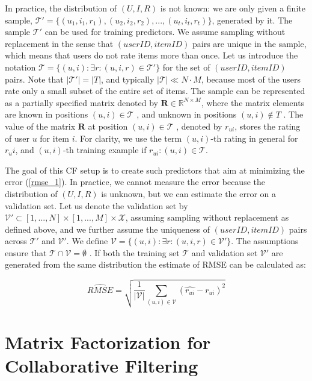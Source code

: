 \documentclass[10pt,a4paper]{article}  %
\begin{document}
In practice, the distribution of $(U,I,R)$ is not known: we are only given a finite sample, $\mathcal{T}' = \{(u_1,i_1,r_1),(u_2,i_2,r_2),...,(u_t,i_t,r_t)\}$, generated by it. The sample $\mathcal{T}'$ can be used for training predictors. We assume sampling without replacement in the sense that $(user ID, item ID)$ pairs are unique in the sample, which means that users do not rate items more than once. Let us introduce the notation $\mathcal{T} =\{(u,i):\exists{r}:(u,i,r) \in \mathcal{T}' \}$ for the set of $(userID, itemID)$ pairs. Note that $|\mathcal{T}'|=|T|$, and typically $|\mathcal{T}| \ll N \cdot M$, because most of the users rate only a small subset of the entire set of items. The sample can be represented as a partially specified matrix denoted by $\mathbf{R} \in \mathbb{R}^{N \times M}$, where the matrix elements are known in positions $(u,i) \in \mathcal{T}$ , and unknown in positions $(u,i) \notin T$ . The value of the matrix $\mathbf{R}$ at position $(u,i) \in \mathcal{T}$ , denoted by $r_{ui}$, stores the rating of user $u$ for item $i$. For clarity, we use the term $(u,i)$-th rating in general for $r_ui$, and $(u,i)$-th training example if $r_{ui} : (u,i) \in \mathcal{T}$.

The goal of this CF setup is to create such predictors that aim at minimizing the error (\ref{rmse_1}). In practice, we cannot measure the error because the distribution of $(U,I,R)$ is unknown, but we can estimate the error on a validation set. Let us denote the validation set by $\mathcal{V}' \subset [1,...,N] \times [1,...,M] \times \mathcal{X}$, assuming sampling without replacement as defined above, and we further assume the uniqueness of $(userID,itemID)$ pairs across $\mathcal{T}'$ and $\mathcal{V}'$. We define $\mathcal{V} = \{(u,i):\exists{r}:(u,i,r) \in \mathcal{V'}\}$. The assumptions ensure that $\mathcal{T} \cap \mathcal{V} = \emptyset$ . If both the training set $\mathcal{T}$ and validation set $\mathcal{V}'$ are generated from the same distribution the estimate of RMSE can be calculated as:

\begin{equation}
  \label{rmse_2}
  \hat{RMSE} = \sqrt{\frac{1}{|\mathcal{V}|} \sum_{(u,i)\in\mathcal{V}} (\hat{r_{ui}} - r_{ui})^2}
\end{equation}

\section{Matrix Factorization for Collaborative Filtering}
\end{document}
